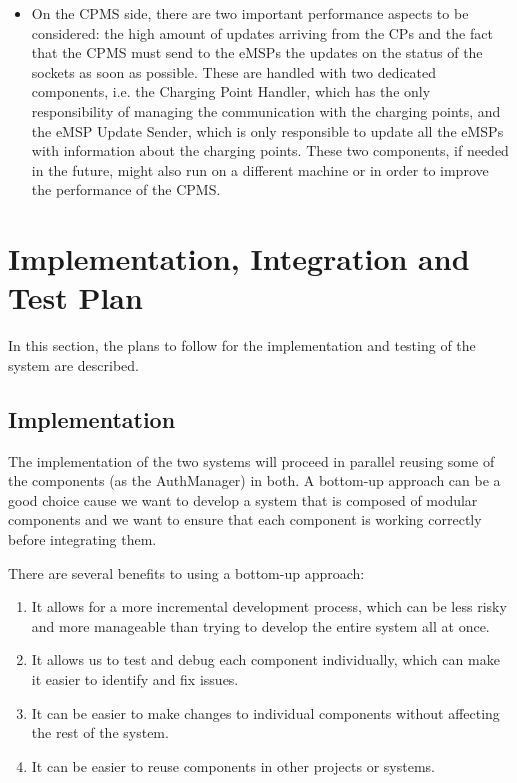 \documentclass{Configuration_Files/PoliMi3i_thesis}
\begin{document}
\begin{itemize}
\begin{itemize}
            \item On the CPMS side, there are two important performance aspects to be considered: the high amount of updates arriving from the CPs and the fact that the CPMS must send to the eMSPs the updates on the status of the sockets as soon as possible. These are handled with two dedicated components, i.e. the Charging Point Handler, which has the only responsibility of managing the communication with the charging points, and the eMSP Update Sender, which is only responsible to update all the eMSPs with information about the charging points. These two components, if needed in the future, might also run on a different machine or in order to improve the performance of the CPMS.
        \end{itemize}
\end{itemize}

\chapter{Implementation, Integration and Test Plan}

In this section, the plans to follow for the implementation and testing of the system are described.

\section{Implementation}
The implementation of the two systems will proceed in parallel reusing some of the components (as the AuthManager) in both. A bottom-up approach can be a good choice cause we want to develop a system that is composed of modular components and we want to ensure that each component is working correctly before integrating them.

There are several benefits to using a bottom-up approach:
\begin{enumerate}
    \item It allows for a more incremental development process, which can be less risky and more manageable than trying to develop the entire system all at once.
    \item It allows us to test and debug each component individually, which can make it easier to identify and fix issues.
    \item It can be easier to make changes to individual components without affecting the rest of the system.
    \item It can be easier to reuse components in other projects or systems.
\end{enumerate}
\end{document}
